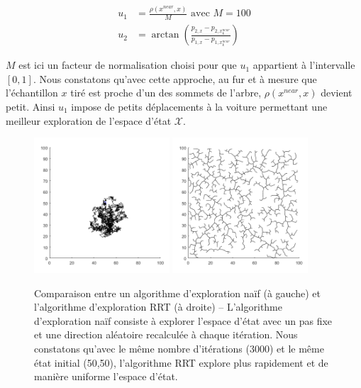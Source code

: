 \documentclass[12pt]{article}
\begin{document}
\begin{align*}
u_1 &= \frac{\rho(x^{near},x)}{M} \text{ avec } M=100\\
u_2 &= \arctan\left(\frac{p_{2,x}-p_{2,x_k^{near}}}{p_{1,x}-p_{1,x_k^{near}}}\right)
\end{align*}

$M$ est ici un facteur de normalisation choisi pour que $u_1$ appartient à l'intervalle $[0,1]$. Nous constatons qu'avec cette approche, au fur et à mesure que l'échantillon $x$ tiré est proche d'un des sommets de l'arbre, $\rho(x^{near},x)$ devient petit. Ainsi $u_1$ impose de petits déplacements à la voiture permettant une meilleur exploration de l'espace d'état $\mathcal{X}$.

\begin{figure}[H]
\centering
\includegraphics[width=0.45\textwidth]{../matlab/native.png}
\includegraphics[width=0.45\textwidth]{../matlab/RRTexplore.png}
\caption{Comparaison entre un algorithme d'exploration naïf (à gauche) et l'algorithme d'exploration RRT (à droite) -- L'algorithme d'exploration naïf consiste à explorer l'espace d'état avec un pas fixe et une direction aléatoire recalculée à chaque itération. Nous constatons qu'avec le même nombre d'itérations (3000) et le même état initial (50,50), l'algorithme RRT explore plus rapidement et de manière uniforme l'espace d'état.}
\label{RRTStar}
\end{figure}
\end{document}
